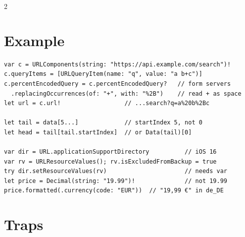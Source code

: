 \documentclass[8pt]{extarticle}
\begin{document}
\begin{multicols}{2}
\columnbreak

\section{Example}
\begin{lstlisting}[language=SwiftSheet]
var c = URLComponents(string: "https://api.example.com/search")!
c.queryItems = [URLQueryItem(name: "q", value: "a b+c")]
c.percentEncodedQuery = c.percentEncodedQuery?   // form servers
  .replacingOccurrences(of: "+", with: "%2B")    // read + as space
let url = c.url!                  // ...search?q=a%20b%2Bc

let tail = data[5...]             // startIndex 5, not 0
let head = tail[tail.startIndex]  // or Data(tail)[0]

var dir = URL.applicationSupportDirectory          // iOS 16
var rv = URLResourceValues(); rv.isExcludedFromBackup = true
try dir.setResourceValues(rv)                      // needs var
let price = Decimal(string: "19.99")!              // not 19.99
price.formatted(.currency(code: "EUR"))  // "19,99 €" in de_DE
\end{lstlisting}

\section{Traps}
\begin{itemize}
\end{itemize}


\end{multicols}
\end{document}

